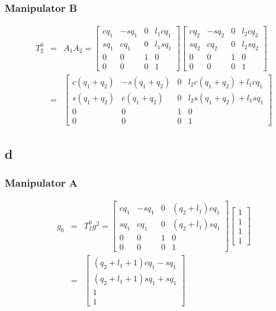 \documentclass[11pt]{article}
\begin{document}
\subsubsection*{Manipulator B}
\begin{eqnarray*}
T^0_2 &=& A_1 A_2 = 
\begin{bmatrix}
c q_1 & - s q_1 & 0 & l_1 c q_1 \\
s q_1 & c q_1 & 0 & l_1 s q_1 \\
0 & 0 & 1 & 0 \\
0 & 0 & 0 & 1
\end{bmatrix}
\begin{bmatrix}
c q_2 & - s q_2 & 0 & l_2 c q_2 \\
s q_2 & c q_2 & 0 & l_2 s q_2 \\
0 & 0 & 1 & 0 \\
0 & 0 & 0 & 1
\end{bmatrix} \\
&=&
\begin{bmatrix}
c (q_1 + q_2) & - s (q_1 + q_2) & 0  & l_2 c (q_1 + q_2) + l_1 c q_1 \\
s (q_1 + q_2) & c (q_1 + q_2)   & 0  & l_2 s (q_1 + q_2) + l_1 s q_1 \\
0     & 0       & 1  & 0        \\
0     & 0       & 0  & 1
\end{bmatrix}
\end{eqnarray*}


\subsection*{d}
\subsubsection*{Manipulator A}
\begin{eqnarray*}
g_0 &=& T^0_2 g^2 = 
\begin{bmatrix}
c q_1 & - s q_1 & 0  & (q_2 + l_1) c q_1 \\
s q_1 & c q_1   & 0  & (q_2 + l_1) s q_1 \\
0     & 0       & 1  & 0        \\
0     & 0       & 0  & 1
\end{bmatrix} 
\begin{bmatrix}
1 \\
1 \\
1 \\
1
\end{bmatrix} \\
&=& 
\begin{bmatrix}
(q_2 + l_1 + 1) c q_1 - s q_1 \\
(q_2 + l_1 + 1) s q_1 + s q_1 \\
1 \\
1
\end{bmatrix}
\end{eqnarray*}
\end{document}
